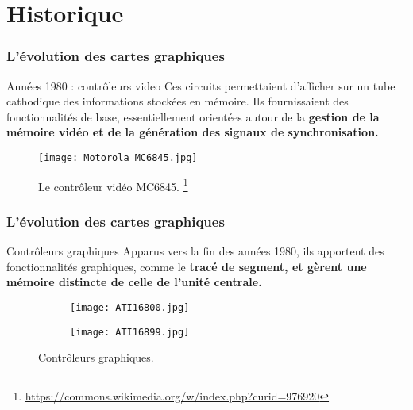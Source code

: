 \section{Historique}
\begin{frame}
    \frametitle{L'évolution des cartes graphiques}
\begin{block}{Années 1980 : contrôleurs video}
  Ces circuits permettaient d'afficher sur un tube cathodique 
  des informations stockées en mémoire. Ils fournissaient des fonctionnalités de base, essentiellement orientées
  autour de la \bf{gestion de la mémoire vidéo} et de la génération des \bf{signaux de synchronisation}. 
  \begin{figure}[ht]
    \centering
    \texttt{[image: Motorola\_MC6845.jpg]}
    \caption{Le contrôleur vidéo MC6845. \footnote{\tiny \url{https://commons.wikimedia.org/w/index.php?curid=976920}}}
    \label{fig:MC6845}
  \end{figure}
\end{block}
\end{frame}
\begin{frame}
  \frametitle{L'évolution des cartes graphiques}
\begin{block}{Contrôleurs graphiques}
  Apparus vers la fin des années 1980, ils apportent des fonctionnalités graphiques, comme le \bf{tracé de segment}, 
  et gèrent une \bf{mémoire distincte} de celle de l'unité centrale.
   \begin{figure}[htbp]
    \centering
    \hfill
   \begin{subfigure}{0.4\textwidth}
    \texttt{[image: ATI16800.jpg]}
   \end{subfigure} 
   \hfill
   \begin{subfigure}{0.4\textwidth}
    \texttt{[image: ATI16899.jpg]}
   \end{subfigure} 
   \hfill
    \caption{Contrôleurs graphiques.}
    \label{fig:graphic_controllers}
   \end{figure}
\end{block}
\end{frame}
